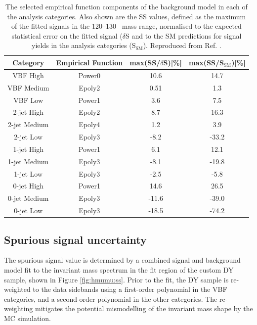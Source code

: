 \begin{table}[htb]
  \centering
  \caption{
    The selected empirical function components of the background model
    in each of the analysis categories. Also shown are the SS values,
    defined as the maximum of the fitted signals in the 120--130
    \GeV~mass range, normalised to the expected statistical error
    on the fitted signal ($\delta$S and to the SM predictions
    for signal yields in the analysis categories (S$_\text{SM}$).
    Reproduced from Ref. \cite{ATLAS-CONF-2019-028}.}
  \label{tab:hmumu:ss}
  \begin{tabular}{cccc}
    \toprule
    \midrule
    Category & Empirical Function & max(SS/$\delta$S)[\%] & max(SS/S$_\text{SM}$)[\%] \\
    \midrule
    VBF High & Power0 & 10.6 & 14.7 \\
    VBF Medium & Epoly2 & 0.51 & 1.3 \\
    VBF Low & Power1 & 3.6 & 7.5 \\
    2-jet High & Epoly2 & 8.7 & 16.3 \\
    2-jet Medium & Epoly4 & 1.2 & 3.9 \\
    2-jet Low & Epoly3 & -8.2 & -33.2 \\
    1-jet High & Power1 & 6.1 & 12.1 \\
    1-jet Medium & Epoly3 & -8.1 & -19.8 \\
    1-jet Low & Epoly3 & -2.5 & -5.8 \\
    0-jet High & Power1 & 14.6 & 26.5 \\
    0-jet Medium & Epoly3 & -11.6 & -39.0 \\
    0-jet Low & Epoly3 & -18.5 & -74.2 \\
    \midrule
    \bottomrule
  \end{tabular}
\end{table}

\subsection{Spurious signal uncertainty}
\label{sec:hmumu:sstest}

The spurious signal value is determined by a combined signal
and background model fit to the invariant mass spectrum
in the fit region of the custom DY sample, shown in Figure
\ref{fig:hmumu:ss}. Prior to the fit,
the DY sample is re-weighted to the data sidebands using a first-order
polynomial in the VBF categories, and a second-order
polynomial in the other categories. The re-weighting mitigates
the potential mismodelling of the invariant mass shape by the
MC simulation.

